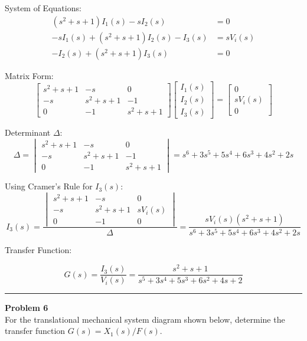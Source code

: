 ﻿\documentclass[11pt]{article}
\begin{document}
{System of Equations:}
\[
\begin{aligned}
(s^2 + s + 1)I_1(s) - sI_2(s) &= 0 \\
-sI_1(s) + (s^2 + s + 1)I_2(s) - I_3(s) &= sV_i(s) \\
-I_2(s) + (s^2 + s + 1)I_3(s) &= 0
\end{aligned}
\]

{Matrix Form:}
\[
\begin{bmatrix}
s^2 + s + 1 & -s & 0 \\
-s & s^2 + s + 1 & -1 \\
0 & -1 & s^2 + s + 1
\end{bmatrix}
\begin{bmatrix}
I_1(s) \\ I_2(s) \\ I_3(s)
\end{bmatrix}
=
\begin{bmatrix}
0 \\ sV_i(s) \\ 0
\end{bmatrix}
\]

{Determinant \(\Delta\):}
\[
\Delta =
\begin{vmatrix}
s^2 + s + 1 & -s & 0 \\
-s & s^2 + s + 1 & -1 \\
0 & -1 & s^2 + s + 1
\end{vmatrix}
= s^6 + 3s^5 + 5s^4 + 6s^3 + 4s^2 + 2s
\]

{Using Cramer's Rule for \(I_3(s)\):}
\[
I_3(s) =
\frac{
\begin{vmatrix}
s^2 + s + 1 & -s & 0 \\
-s & s^2 + s + 1 & sV_i(s) \\
0 & -1 & 0
\end{vmatrix}
}
{\Delta}
= \frac{sV_i(s)(s^2 + s + 1)}{s^6 + 3s^5 + 5s^4 + 6s^3 + 4s^2 + 2s}
\]


{Transfer Function:}

\[
\boxed{
G(s) = \frac{I_3(s)}{V_i(s)} = \frac{s^2 + s + 1}{s^5 + 3s^4 + 5s^3 + 6s^2 + 4s + 2}
}
\]

\newpage
  \setcounter{page}{9}  
\noindent\rule{\textwidth}{1pt}
\noindent\textbf{Problem 6} \hfill
\\For the translational mechanical system diagram shown below, determine the transfer function $G(s)=X_1(s)/F(s)$.
\end{document}
